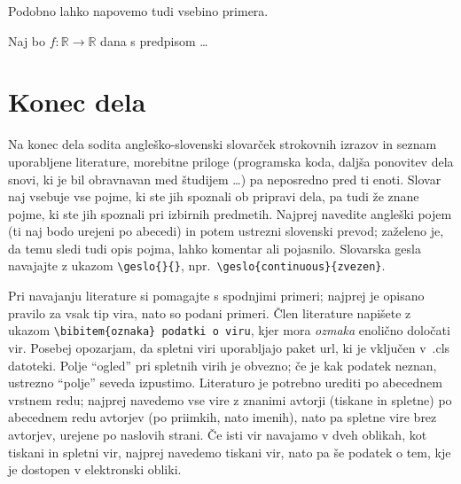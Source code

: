 \documentclass[mat1, tisk]{fmfdelo}
\newcommand{\R}{\mathbb R}
\begin{document}
Podobno lahko napovemo tudi vsebino primera.

\begin{primer}
  Naj bo $f \colon \R \to \R$ dana s predpisom \dots
\end{primer}



\section{Konec dela}

Na konec dela sodita angleško-slovenski slovarček strokovnih izrazov in seznam
uporabljene literature, morebitne priloge (programska koda, daljša ponovitev
dela snovi, ki je bil obravnavan med študijem \dots) pa neposredno pred ti
enoti. Slovar naj vsebuje vse pojme, ki ste jih spoznali ob pripravi dela, pa
tudi že znane pojme, ki ste jih spoznali pri izbirnih predmetih. Najprej
navedite angleški pojem (ti naj bodo urejeni po abecedi) in potem ustrezni
slovenski prevod; zaželeno je, da temu sledi tudi opis pojma, lahko komentar
ali pojasnilo. Slovarska gesla navajajte z ukazom \verb|\geslo{}{}|, npr.\
\verb|\geslo{continuous}{zvezen}|.

Pri navajanju literature si pomagajte s spodnjimi primeri; najprej je opisano
pravilo za vsak tip vira, nato so podani primeri. Člen literature napišete z
ukazom \verb|\bibitem{oznaka} podatki o viru|, kjer mora \emph{ozmaka} enolično
določati vir.  Posebej opozarjam, da spletni viri uporabljajo paket url, ki je
vključen v~.cls datoteki. Polje ``ogled'' pri spletnih virih je obvezno; če je
kak podatek neznan, ustrezno ``polje'' seveda izpustimo. Literaturo je potrebno
urediti po abecednem vrstnem redu; najprej navedemo vse vire z znanimi avtorji
(tiskane in spletne) po abecednem redu avtorjev (po priimkih, nato imenih),
nato pa spletne vire brez avtorjev, urejene po naslovih strani. Če isti vir
navajamo v dveh oblikah, kot tiskani in spletni vir, najprej navedemo tiskani
vir, nato pa še podatek o tem, kje je dostopen v elektronski obliki.
\end{document}
